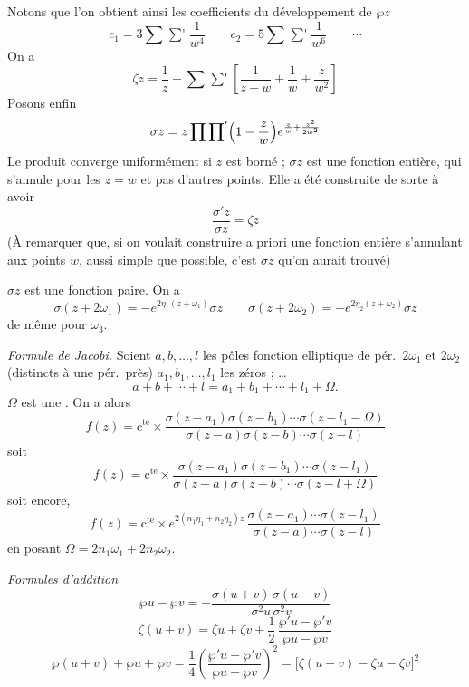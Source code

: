\documentclass[11pt,a4paper]{article}
\begin{document}
Notons que l'on obtient ainsi les coefficients du développement de $\wp z$
\[
c_1 = 3\sum\mathop{{\sum}'} \frac{1}{w^4} \qquad
c_2 = 5\sum\mathop{{\sum}'} \frac{1}{w^6} \qquad \cdots
\]
On a
\[
\zeta z = \frac{1}{z} + \sum\mathop{{\sum}'} \left[\frac{1}{z-w} + \frac{1}{w}
+ \frac{z}{w^2}\right]
\]
Posons enfin
\[
\sigma z = z \prod\mathop{{\prod}'} \Bigl(1 - \frac{z}{w}\Bigr)
e^{\frac{z}{w} + \frac{z^2}{2w^2}}
\]
Le produit  converge uniformément  si $z$ est borné ;
$\sigma z$ est une fonction entière, qui s'annule pour les $z = w$ et pas d'autres
points. Elle a été construite de sorte à avoir
\[
\frac{\sigma' z}{\sigma z} = \zeta z
\]
(À remarquer que, si on voulait construire a priori une fonction entière
s'annulant aux points $w$, aussi simple que possible, c'est $\sigma z$ qu'on
aurait trouvé)

$\sigma z$ est une fonction paire. On a
\[
\sigma(z+2\omega_1) = -e^{2\eta_1(z+\omega_1)}\sigma z \qquad
\sigma(z+2\omega_2) = -e^{2\eta_2(z+\omega_2)}\sigma z
\]
de même pour $\omega_3$.

\emph{Formule de Jacobi.} Soient $a, b, \ldots, l$ les pôles
  fonction elliptique de pér.\ $2\omega_1$ et $2\omega_2$
(distincts à une pér.\ près) $a_1, b_1, \ldots, l_1$ les zéros ; \ldots
\[
a + b + \cdots + l = a_1 + b_1 + \cdots + l_1 + \Omega .
\]
$\Omega$ est une .
On a alors
\[
f(z) = \text{c}^{\text{te}} \times
\frac{\sigma(z-a_1)\sigma(z-b_1)\cdots\sigma(z-l_1-\Omega)}
{\sigma(z-a)\sigma(z-b)\cdots\sigma(z-l)}
\]
soit
\[
f(z) = \text{c}^{\text{te}} \times
\frac{\sigma(z-a_1)\sigma(z-b_1)\cdots\sigma(z-l_1)}
{\sigma(z-a)\sigma(z-b)\cdots\sigma(z-l+\Omega)}
\]
soit encore, \ill{}
\[
f(z) = \text{c}^{\text{te}} \times e^{2(n_1\eta_1+n_2\eta_2)z}\,
\frac{\sigma(z-a_1)\cdots\sigma(z-l_1)}{\sigma(z-a)\cdots\sigma(z-l)}
\]
en posant $\Omega = 2n_1\omega_1 + 2n_2\omega_2$.

\emph{Formules d'addition}
\[
\wp u - \wp v = -\frac{\sigma(u+v)\,\sigma(u-v)}{\sigma^2 u\,\sigma^2 v}
\]
\[
\zeta(u+v) = \zeta u + \zeta v + \frac{1}{2}\,\frac{\wp' u - \wp' v}{\wp u - \wp v}
\]
\[
\wp(u+v) + \wp u + \wp v = \frac{1}{4}\left(\frac{\wp' u - \wp' v}{\wp u - \wp v}\right)^2
= \bigl[\zeta(u+v) - \zeta u - \zeta v\bigr]^2
\]
\end{document}
